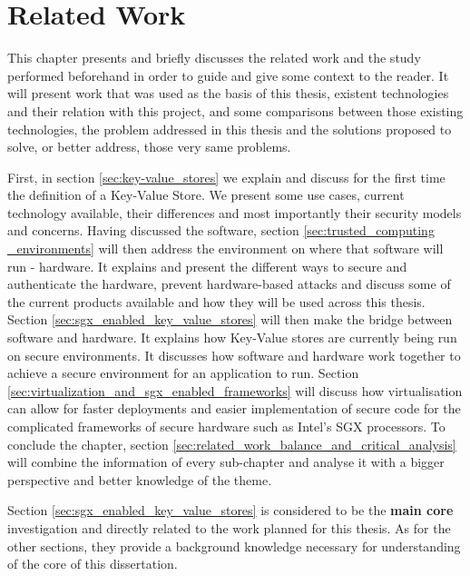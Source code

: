 \chapter{Related Work}
\label{cha:related_work}

This chapter presents and briefly discusses the related work and the study performed beforehand in order to guide and give some context to the reader. It will present work that was used as the basis of this thesis, existent technologies and their relation with this project, and some comparisons between those existing technologies, the problem addressed in this thesis and the solutions proposed to solve, or better address, those very same problems.

First, in section \ref{sec:key-value_stores} we explain and discuss for the first time the definition of a Key-Value Store. We present some use cases, current technology available, their differences and most importantly their security models and concerns.
Having discussed the software, section \ref{sec:trusted_computing _environments} will then address the environment on where that software will run - hardware. It explains and present the different ways to secure and authenticate the hardware, prevent hardware-based attacks and discuss some of the current products available and how they will be used across this thesis.
Section \ref{sec:sgx_enabled_key_value_stores} will then make the bridge between software and hardware. It explains how Key-Value stores are currently being run on secure environments. It discusses how software and hardware work together to achieve a secure environment for an application to run. Section \ref{sec:virtualization_and_sgx_enabled_frameworks} will discuss how virtualisation can allow for faster deployments and easier implementation of secure code for the complicated frameworks of secure hardware such as Intel's SGX processors. To conclude the chapter, section \ref{sec:related_work_balance_and_critical_analysis} will combine the information of every sub-chapter and analyse it with a bigger perspective and better knowledge of the theme.

Section \ref{sec:sgx_enabled_key_value_stores} is considered to be the \textbf{main core} investigation and directly related to the work planned for this thesis. As for the other sections, they provide a background knowledge necessary for understanding of the core of this dissertation.

